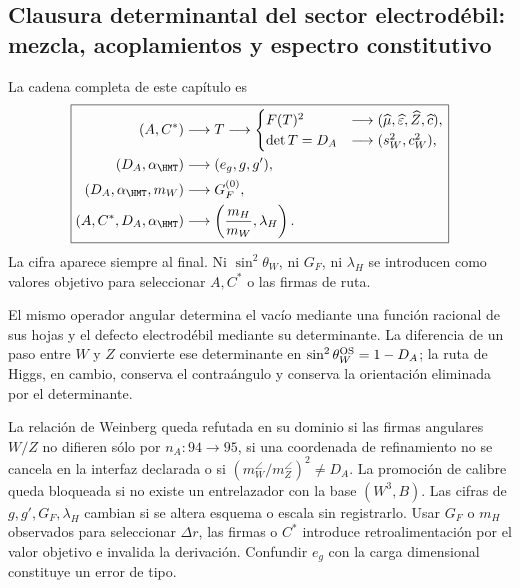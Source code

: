 \subsection{Clausura determinantal del sector electrodébil: mezcla, acoplamientos y espectro constitutivo}

La cadena completa de este cap\'itulo es
\begin{equation}
\label{rm:eq:ew-causal-diagram}
\boxed{
\begin{aligned}
(A,C^*)&\longrightarrow T
\longrightarrow
\begin{cases}
F(T)^2&\longrightarrow
(\widehat\mu,\widehat\varepsilon,\widehat Z,\widehat c),\\
\det T=D_A&\longrightarrow
(s_W^2,c_W^2),
\end{cases}\\
(D_A,\alpha_{\HMT})&\longrightarrow(e_g,g,g'),\\
(D_A,\alpha_{\HMT},m_W)&\longrightarrow G_F^{(0)},\\
(A,C^*,D_A,\alpha_{\HMT})&\longrightarrow
\left(\frac{m_H}{m_W},\lambda_H\right).
\end{aligned}}
\end{equation}
La cifra aparece siempre al final. Ni \(\sin^2\theta_W\), ni
\(G_F\), ni \(\lambda_H\) se introducen como valores objetivo para seleccionar
\(A,C^*\) o las firmas de ruta.

\begin{keyresult}
El mismo operador angular determina el vac\'io mediante una funci\'on racional
de sus hojas y el defecto electrod\'ebil mediante su determinante. La
diferencia de un paso entre \(W\) y \(Z\) convierte ese determinante en
\(\sin^2\theta_W^{\rm OS}=1-D_A\); la ruta de Higgs, en cambio, conserva
el contra\'angulo y conserva la orientaci\'on eliminada por el determinante.
\end{keyresult}

\begin{falsifier}
La relaci\'on de Weinberg queda refutada en su dominio si las firmas
angulares \(W/Z\) no difieren s\'olo por \(n_A:94\to95\), si una coordenada
de refinamiento no se cancela en la interfaz declarada o si
\((m_W^{\angle}/m_Z^{\angle})^2\neq D_A\). La promoci\'on de calibre queda
bloqueada si no existe un entrelazador con la base \((W^3,B)\). Las cifras
de \(g,g',G_F,\lambda_H\) cambian si se altera esquema o escala sin
registrarlo. Usar \(G_F\) o \(m_H\) observados para seleccionar
\(\Delta r\), las firmas o \(C^*\) introduce retroalimentaci\'on por el
valor objetivo e invalida la derivaci\'on. Confundir \(e_g\) con la carga
dimensional constituye un error de tipo.
\end{falsifier}

